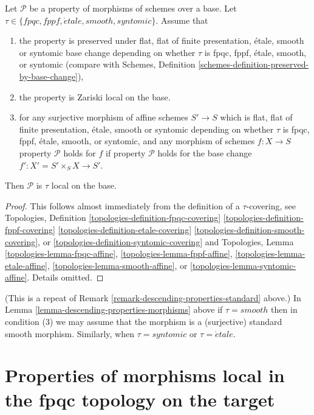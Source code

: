 \begin{lemma}
\label{lemma-descending-properties-morphisms}
Let $\mathcal{P}$ be a property of morphisms of schemes over a base.
Let $\tau \in \{fpqc, fppf, \acute{e}tale, smooth, syntomic\}$.
Assume that
\begin{enumerate}
\item the property is preserved under
flat, flat of finite presentation, \'etale, smooth or syntomic base change
depending on whether $\tau$ is fpqc, fppf, \'etale, smooth, or syntomic
(compare with
Schemes, Definition \ref{schemes-definition-preserved-by-base-change}),
\item the property is Zariski local on the base.
\item for any surjective morphism of affine schemes $S' \to S$
which is flat, flat of finite presentation,
\'etale, smooth or syntomic depending on whether $\tau$ is
fpqc, fppf, \'etale, smooth, or syntomic,
and any morphism of schemes $f : X \to S$ property
$\mathcal{P}$ holds for $f$ if property $\mathcal{P}$
holds for the base change $f' : X' = S' \times_S X \to S'$.
\end{enumerate}
Then $\mathcal{P}$ is $\tau$ local on the base.
\end{lemma}

\begin{proof}
This follows almost immediately from the definition of
a $\tau$-covering, see
Topologies, Definition
\ref{topologies-definition-fpqc-covering}
\ref{topologies-definition-fppf-covering}
\ref{topologies-definition-etale-covering}
\ref{topologies-definition-smooth-covering}, or
\ref{topologies-definition-syntomic-covering}
and Topologies, Lemma
\ref{topologies-lemma-fpqc-affine},
\ref{topologies-lemma-fppf-affine},
\ref{topologies-lemma-etale-affine},
\ref{topologies-lemma-smooth-affine}, or
\ref{topologies-lemma-syntomic-affine}.
Details omitted.
\end{proof}

\begin{remark}
\label{remark-descending-properties-morphisms-standard}
(This is a repeat of Remark \ref{remark-descending-properties-standard} above.)
In Lemma \ref{lemma-descending-properties-morphisms} above if
$\tau = smooth$ then in condition (3) we may assume that
the morphism is a (surjective) standard smooth morphism.
Similarly, when $\tau = syntomic$ or $\tau = \acute{e}tale$.
\end{remark}




\section{Properties of morphisms local in the fpqc topology on the target}
\label{section-descending-properties-morphisms-fpqc}

